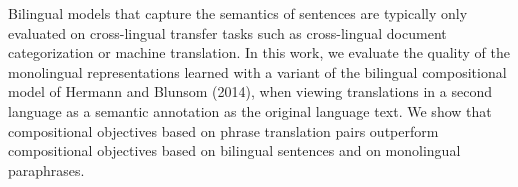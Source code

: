 Bilingual models that capture the semantics of sentences are typically only evaluated on cross-lingual transfer tasks such as cross-lingual document categorization or machine translation. In this work, we evaluate the quality of the monolingual representations learned with a variant of the bilingual compositional model of Hermann and Blunsom (2014), when viewing translations in a second language as a semantic annotation as the original language text. We show that compositional objectives based on phrase translation pairs outperform compositional objectives based on bilingual sentences and on monolingual paraphrases.
